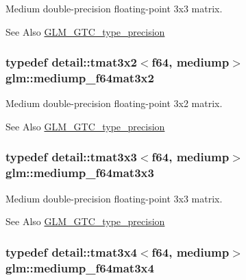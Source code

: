 Medium double-\/precision floating-\/point 3x3 matrix. \begin{DoxySeeAlso}{See Also}
\hyperlink{group__gtc__type__precision}{G\-L\-M\-\_\-\-G\-T\-C\-\_\-type\-\_\-precision} 
\end{DoxySeeAlso}
\hypertarget{group__gtc__type__precision_gad6408472435fce994a3bb9d14d321ddd}{
\subsubsection[{mediump\-\_\-f64mat3x2}]{\setlength{\rightskip}{0pt plus 5cm}typedef detail\-::tmat3x2$<$f64, mediump$>$ {\bf glm\-::mediump\-\_\-f64mat3x2}}}\label{group__gtc__type__precision_gad6408472435fce994a3bb9d14d321ddd}
Medium double-\/precision floating-\/point 3x2 matrix. \begin{DoxySeeAlso}{See Also}
\hyperlink{group__gtc__type__precision}{G\-L\-M\-\_\-\-G\-T\-C\-\_\-type\-\_\-precision} 
\end{DoxySeeAlso}
\hypertarget{group__gtc__type__precision_ga871b69a221dae7461aa746e6e6d372fc}{
\subsubsection[{mediump\-\_\-f64mat3x3}]{\setlength{\rightskip}{0pt plus 5cm}typedef detail\-::tmat3x3$<$f64, mediump$>$ {\bf glm\-::mediump\-\_\-f64mat3x3}}}\label{group__gtc__type__precision_ga871b69a221dae7461aa746e6e6d372fc}
Medium double-\/precision floating-\/point 3x3 matrix. \begin{DoxySeeAlso}{See Also}
\hyperlink{group__gtc__type__precision}{G\-L\-M\-\_\-\-G\-T\-C\-\_\-type\-\_\-precision} 
\end{DoxySeeAlso}
\hypertarget{group__gtc__type__precision_gac3b0ca6d79631a2480cee8897dcd79ec}{
\subsubsection[{mediump\-\_\-f64mat3x4}]{\setlength{\rightskip}{0pt plus 5cm}typedef detail\-::tmat3x4$<$f64, mediump$>$ {\bf glm\-::mediump\-\_\-f64mat3x4}}}\label{group__gtc__type__precision_gac3b0ca6d79631a2480cee8897dcd79ec}
